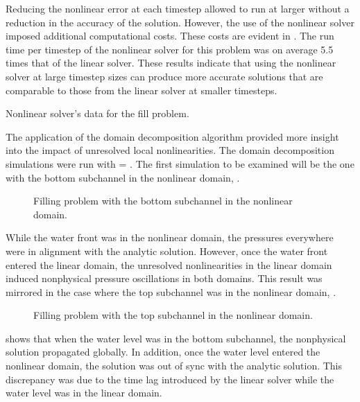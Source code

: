 Reducing the nonlinear error at each timestep allowed \cobra{} to run at larger \dt{} without a reduction in the accuracy of the solution.
However, the use of the nonlinear solver imposed additional computational costs.
These costs are evident in .
The run time per timestep of the nonlinear solver for this problem was on average 5.5 times that of the linear solver.
These results indicate that using the nonlinear solver at large timestep sizes can produce more accurate solutions that are comparable to those from the linear solver at smaller timesteps.

\begin{table}[h!tb]
\centering
\singlespace

\caption{Nonlinear solver's data for the fill problem.}
\label{tab:vmpNlnRunTime}
\end{table}

The application of the domain decomposition algorithm provided more insight into the impact of unresolved local nonlinearities.
The domain decomposition simulations were run with \dtmax{} = .
The first simulation to be examined will be the one with the bottom subchannel in the nonlinear domain, .

\begin{figure}[h!tb]
\centering

\caption{Filling problem with the bottom subchannel in the nonlinear domain.}
\label{fig:vmpDDBotChan}
\end{figure}

While the water front was in the nonlinear domain, the pressures everywhere were in alignment with the analytic solution.
However, once the water front entered the linear domain, the unresolved nonlinearities in the linear domain induced nonphysical pressure oscillations in both domains.
This result was mirrored in the case where the top subchannel was in the nonlinear domain, .

\begin{figure}[h!tb]
\centering

\caption{Filling problem with the top subchannel in the nonlinear domain.}
\label{fig:vmpDDTopChan}
\end{figure}

 shows that when the water level was in the bottom subchannel, the nonphysical solution propagated globally.
In addition, once the water level entered the nonlinear domain, the solution was out of sync with the analytic solution.
This discrepancy was due to the time lag introduced by the linear solver while the water level was in the linear domain.

